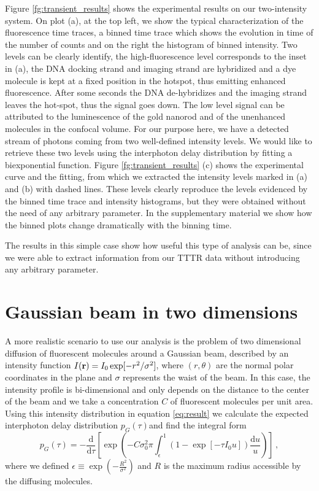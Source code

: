Figure \ref{fg:transient_results} shows the experimental results
 on our two-intensity system. On plot (a), at the top left, we 
show the typical characterization of the fluorescence time traces, 
a binned time trace which shows the evolution in time of the 
number of counts and on the right the histogram of binned 
intensity. Two levels can be clearly identify, the high-fluorescence 
level corresponds to the inset in (a), the DNA docking strand and 
imaging strand are hybridized and a dye molecule is kept at a fixed 
position in the hotspot, thus emitting enhanced fluorescence. After 
some seconds the DNA de-hybridizes and the imaging strand leaves the 
hot-spot, thus the signal goes down. 
The low level signal can be attributed to the luminescence of the 
gold nanorod and of the unenhanced molecules in the confocal volume. 
For our purpose here, we have a detected stream of photons coming 
from two well-defined intensity levels. 
We would like to retrieve these two levels using the interphoton 
delay distribution by fitting a biexponential function. 
Figure \ref{fg:transient_results} (c) shows the experimental curve 
and the fitting, from which we extracted the intensity levels 
marked in (a) and (b) with dashed lines. These levels clearly 
reproduce the levels evidenced by the binned time trace and intensity 
histograms, but they were obtained without the need of any arbitrary 
parameter. In the supplementary material we show how the binned plots 
change dramatically with the binning time. 

The results in this simple case show how useful this type of analysis 
can be, since we were able to extract information from our TTTR data 
without introducing any arbitrary parameter.


\section{Gaussian beam in two dimensions\label{sec:gaussian2d}}

A more realistic scenario to use our analysis is the problem of two 
dimensional diffusion of fluorescent molecules around a Gaussian beam, 
described by an intensity function $I({\mathbf{r}}) = I_0 \exp[-r^2/\sigma^2]$, 
where $(r,\theta)$ are the normal polar coordinates in the plane and 
$\sigma$ represents the waist of the beam. 
In this case, the intensity profile is bi-dimensional and only depends
on the distance to the center of the beam and we take a concentration 
$C$ of fluorescent molecules per unit area. Using this intensity 
distribution in equation \ref{eq:result} we calculate the expected 
interphoton delay distribution $p_G(\tau)$and find the integral form
\begin{equation}
p_{G}(\tau)=-\frac{\mbox{d}}{\mbox{d}\tau}\left[ \exp\left(-C \sigma_0^2 \pi \int_{\epsilon}^1\left(1-\exp\left[-\tau I_0 u \right]\right) \frac{\mbox{d}u}{u}\right)    \right]\,,  
\label{eq:gaussian2d}
\end{equation}
where we defined $\epsilon \equiv \exp\left(-\frac{R^2}{\sigma^2}\right)$ 
and $R$ is the maximum radius accessible by the diffusing molecules.

